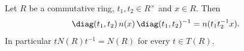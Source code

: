 Let $R$ be a commutative ring, $t_1,t_2\in R^\times$ and $x\in R$. Then
\[
  \diag(t_1,t_2)\,n(x)\,\diag(t_1,t_2)^{-1}=n(t_1t_2^{-1}x).
\]
In particular $tN(R)t^{-1}=N(R)$ for every $t\in T(R)$.
